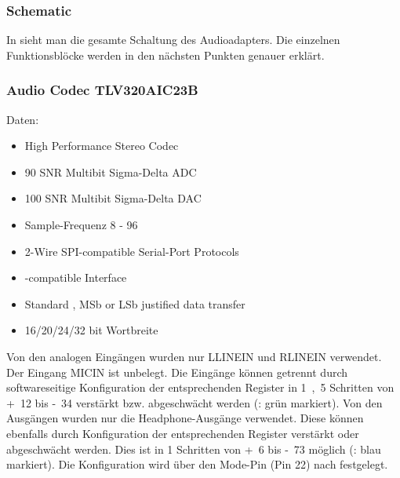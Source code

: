 
\subsubsection{Schematic}
In  sieht man die gesamte Schaltung des Audioadapters. Die einzelnen Funktionsblöcke werden in den nächsten Punkten genauer erklärt.


\subsubsection{Audio Codec TLV320AIC23B \cite{ti:tlv320aic23b}}
\label{sec:audio-codec}
Daten:
\begin{itemize}
    \item High Performance Stereo Codec
    \item \unit{90}{\deci\bel} \gls{SNR} Multibit Sigma-Delta \gls{ADC}
    \item \unit{100}{\deci\bel} \gls{SNR} Multibit Sigma-Delta \gls{DAC}
    \item Sample-Frequenz \unit{8}{\kilo\hertz} - \unit{96}{\kilo\hertz}
    \item 2-Wire SPI-compatible Serial-Port Protocols
    \item \IIS{}-compatible Interface
    \item Standard \IIS{}, \gls{MSb} or \gls{LSb} justified data transfer
    \item 16/20/24/32 bit Wortbreite
\end{itemize}


Von den analogen Eingängen wurden nur LLINEIN und RLINEIN verwendet. Der Eingang MICIN ist unbelegt. Die Eingänge können getrennt durch softwareseitige Konfiguration der entsprechenden Register in \unit{1,5}{\deci\bel} Schritten von \unit{+12}{\deci\bel} bis \unit{-34}{\deci\bel} verstärkt bzw. abgeschwächt werden (: grün markiert). Von den Ausgängen wurden nur die Headphone-Ausgänge verwendet. Diese können ebenfalls durch Konfiguration der entsprechenden Register verstärkt oder abgeschwächt werden. Dies ist in \unit{1}{\deci\bel} Schritten von \unit{+6}{\deci\bel} bis \unit{-73}{\deci\bel} möglich (: blau markiert). Die Konfiguration wird über den Mode-Pin (Pin 22) nach  festgelegt. 

